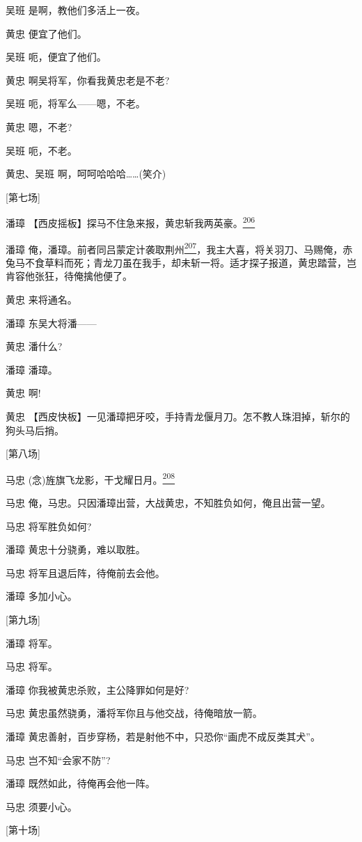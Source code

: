 吴班 是啊，教他们多活上一夜。

黄忠 便宜了他们。

吴班 呃，便宜了他们。

黄忠 啊吴将军，你看我黄忠老是不老?

吴班 呃，将军么------嗯，不老。

黄忠 嗯，不老?

吴班 呃，不老。

黄忠、吴班 啊，呵呵哈哈哈\ldots{}\ldots{}(笑介)

{[}第七场{]}

潘璋
【西皮摇板】探马不住急来报，黄忠斩我两英豪。\protect\hyperlink{fn206}{\textsuperscript{206}}

潘璋
俺，潘璋。前者同吕蒙定计袭取荆州\protect\hyperlink{fn207}{\textsuperscript{207}}，我主大喜，将关羽刀、马赐俺，赤兔马不食草料而死；青龙刀虽在我手，却未斩一将。适才探子报道，黄忠踏营，岂肯容他张狂，待俺擒他便了。

黄忠 来将通名。

潘璋 东吴大将潘------

黄忠 潘什么?

潘璋 潘璋。

黄忠 啊!

黄忠
【西皮快板】一见潘璋把牙咬，手持青龙偃月刀。怎不教人珠泪掉，斩尔的狗头马后捎。

{[}第八场{]}

马忠
(念)旌旗飞龙影，干戈耀日月。\protect\hyperlink{fn208}{\textsuperscript{208}}

马忠 俺，马忠。只因潘璋出营，大战黄忠，不知胜负如何，俺且出营一望。

马忠 将军胜负如何?

潘璋 黄忠十分骁勇，难以取胜。

马忠 将军且退后阵，待俺前去会他。

潘璋 多加小心。

{[}第九场{]}

潘璋 将军。

马忠 将军。

潘璋 你我被黄忠杀败，主公降罪如何是好?

马忠 黄忠虽然骁勇，潘将军你且与他交战，待俺暗放一箭。

潘璋 黄忠善射，百步穿杨，若是射他不中，只恐你``画虎不成反类其犬''。

马忠 岂不知``会家不防''?

潘璋 既然如此，待俺再会他一阵。

马忠 须要小心。

{[}第十场{]}

